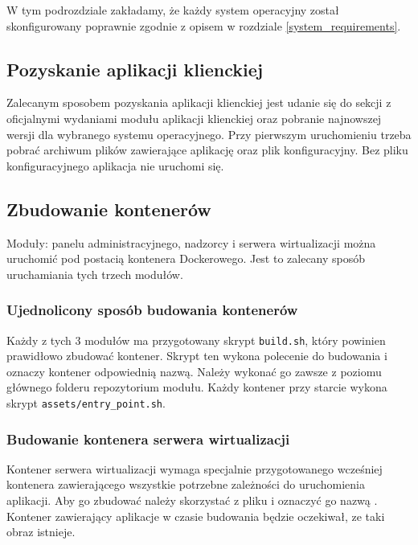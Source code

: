 \documentclass[../opis-rozwiazania.tex]{subfiles}
\begin{document}
\label{system_startup}

W tym podrozdziale zakładamy, że każdy system operacyjny został skonfigurowany poprawnie zgodnie z opisem w rozdziale \ref{system_requirements}.

\subsection{Pozyskanie aplikacji klienckiej}
\label{system_startup.client_obtaining}
Zalecanym sposobem pozyskania aplikacji klienckiej jest udanie się do sekcji z oficjalnymi wydaniami \parencite{ocd-client-releases} modułu aplikacji klienckiej oraz pobranie najnowszej wersji dla wybranego systemu operacyjnego.
Przy pierwszym uruchomieniu trzeba pobrać archiwum plików zawierające aplikację oraz plik konfiguracyjny.
Bez pliku konfiguracyjnego aplikacja nie uruchomi się.

\subsection{Zbudowanie kontenerów}
\label{system_startup.containers}

Moduły: panelu administracyjnego, nadzorcy i serwera wirtualizacji można uruchomić pod postacią kontenera Dockerowego.
Jest to zalecany sposób uruchamiania tych trzech modułów.

\subsubsection{Ujednolicony sposób budowania kontenerów}
Każdy z tych 3 modułów ma przygotowany skrypt \texttt{build.sh}, który powinien prawidłowo zbudować kontener.
Skrypt ten wykona polecenie do budowania i oznaczy kontener odpowiednią nazwą.
Należy wykonać go zawsze z poziomu głównego folderu repozytorium modułu.
Każdy kontener przy starcie wykona skrypt \texttt{assets/entry\_point.sh}.

\subsubsection{Budowanie kontenera serwera wirtualizacji}
Kontener serwera wirtualizacji wymaga specjalnie przygotowanego wcześniej kontenera zawierającego wszystkie potrzebne zależności do uruchomienia aplikacji.
Aby go zbudować należy skorzystać z pliku \texttt{} i oznaczyć go nazwą \texttt{}.
Kontener zawierający aplikacje w czasie budowania będzie oczekiwał, ze taki obraz istnieje.
\end{document}
